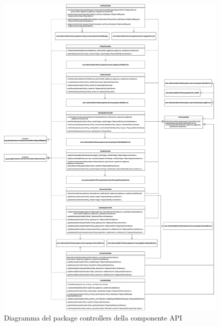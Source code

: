 		\begin{figure}[H]
			\centering
			\includegraphics[scale=0.295]{res/images/API/Controllers.png}
			\caption{Diagramma del package controllers della componente API}
			\label{Diagramma 13}
		\end{figure}

